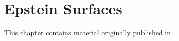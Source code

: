 \chapter{Epstein Surfaces}
\label{epstein-surfaces}

\noindent This chapter contains material originally published in \cite{quinn2020}.




